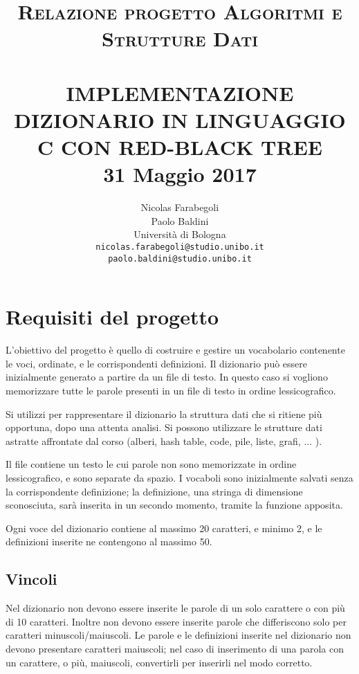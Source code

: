 \documentclass[paper=a4, fontsize=11pt,twoside]{scrartcl}   %
\title{ \normalsize \textsc{Relazione progetto Algoritmi e Strutture Dati}    %
	\\[2.0cm]                               %
	\HRule{0.5pt} \\                        %
	\LARGE \textbf{\uppercase{Implementazione dizionario in linguaggio 
			C con Red-Black Tree}}    %
	\HRule{2pt} \\ [0.5cm]      %
	\normalsize 31 Maggio 2017          %
}
\author{
	Nicolas Farabegoli\\
	Paolo Baldini\\
	Università di Bologna\\  
	\texttt{nicolas.farabegoli@studio.unibo.it} \\
	\texttt{paolo.baldini@studio.unibo.it}\\
}
\makeatletter
\def\printtitle{%
	{\centering \@title\par}}
\def\printauthor{%
	{\centering \large \@author}}
\makeatother
\begin{document}
	\thispagestyle{empty}       %
	
	\printtitle                 %
	\vfill
	\printauthor                %
	\newpage
	\tableofcontents
	\newpage
	\setcounter{page}{1}        %
	
	\section{Requisiti del progetto}
		L'obiettivo del progetto è quello di costruire e gestire un vocabolario 
		contenente le voci, ordinate, e le corrispondenti definizioni. 
		Il dizionario può essere inizialmente generato a partire da un file di testo.  
		In questo caso si vogliono memorizzare tutte le parole presenti in un file di 
		testo in ordine lessicografico.
		
		Si utilizzi per rappresentare il dizionario la struttura dati che si ritiene 
		più opportuna, dopo una attenta analisi. Si possono utilizzare le strutture 
		dati astratte affrontate dal corso (alberi, hash table, code, pile, liste, 
		grafi, ... ).
		
		Il file contiene un testo le cui parole non sono memorizzate in ordine lessicografico, e sono separate da spazio. I vocaboli sono inizialmente salvati senza la corrispondente definizione; la definizione, una stringa di dimensione sconosciuta, sarà inserita in un secondo momento, tramite la funzione apposita.
		
		Ogni voce del dizionario contiene al massimo 20 caratteri, e minimo 2, e le definizioni inserite ne contengono al massimo 50.
		
			\subsection{Vincoli}
				Nel dizionario non devono essere inserite le parole di un solo carattere o con più di 10 caratteri. Inoltre non devono essere inserite parole che differiscono solo per caratteri minuscoli/maiuscoli. Le parole e le definizioni inserite nel dizionario non devono presentare caratteri maiuscoli; nel caso di inserimento di una parola con un carattere, o più, maiuscoli, convertirli per inserirli nel modo corretto. 
				
\end{document}
